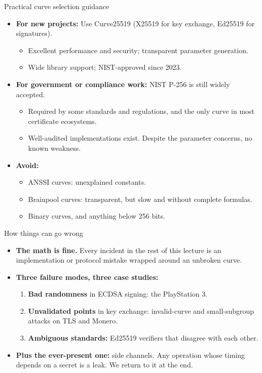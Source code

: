 \ifdefined\PRESENTATION\else\PassOptionsToClass{handout}{beamer}\fi\documentclass[aspectratio=169, lualatex]{beamer}
\begin{document}
\begin{frame}{Practical curve selection guidance}
	\begin{itemize}
		\item \textbf{For new projects:} Use Curve25519 (X25519 for key exchange, Ed25519 for signatures).
		      \begin{itemize}
			      \item Excellent performance and security; transparent parameter generation.
			      \item Wide library support; NIST-approved since 2023.
		      \end{itemize}
		\item \textbf{For government or compliance work:} NIST P-256 is still widely accepted.
		      \begin{itemize}
			      \item Required by some standards and regulations, and the only curve in most certificate ecosystems.
			      \item Well-audited implementations exist. Despite the parameter concerns, no known weakness.
		      \end{itemize}
		\item \textbf{Avoid:}
		      \begin{itemize}
			      \item ANSSI curves: unexplained constants.
			      \item Brainpool curves: transparent, but slow and without complete formulas.
			      \item Binary curves, and anything below 256 bits.
		      \end{itemize}
	\end{itemize}
\end{frame}

\begin{frame}{How things can go wrong}
	\begin{itemize}
		\item \textbf{The math is fine.} Every incident in the rest of this lecture is an implementation or protocol mistake wrapped around an unbroken curve.
		\item \textbf{Three failure modes, three case studies:}
		      \begin{enumerate}
			      \item \textbf{Bad randomness} in ECDSA signing: the PlayStation 3.
			      \item \textbf{Unvalidated points} in key exchange: invalid-curve and small-subgroup attacks on TLS and Monero.
			      \item \textbf{Ambiguous standards:} Ed25519 verifiers that disagree with each other.
		      \end{enumerate}
		\item \textbf{Plus the ever-present one:} side channels. Any operation whose timing depends on a secret is a leak. We return to it at the end.
	\end{itemize}
\end{frame}
\end{document}

